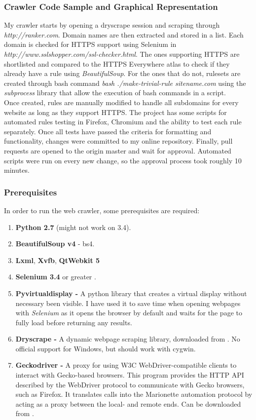 \documentclass[a4paper, 12pt, titlepage]{article}
\begin{document}
\subsubsection{Crawler Code Sample and Graphical Representation}
My crawler starts by opening a dryscrape session and scraping through \textit{http://ranker.com}. Domain names are then extracted and stored in a list. Each domain is checked for HTTPS support using Selenium in \textit{http://www.sslshopper.com/ssl-checker.html}. The ones supporting HTTPS are shortlisted and compared to the HTTPS Everywhere atlas to check if they already have a rule using \textit{BeautifulSoup}. For the ones that do not, rulesets are created through bash command \textit{bash ./make-trivial-rule sitename.com} using the \textit{subprocess} library that allow the execution of bash commands in a script. \\[6pt]
Once created, rules are manually modified to handle all subdomains for every website as long as they support HTTPS. The project has some scripts for automated rules testing in Firefox, Chromium and the ability to test each rule separately. Once all tests have passed the criteria for formatting and functionality, changes were committed to my online repository. Finally, pull requests are opened to the origin master and wait for approval. Automated scripts were run on every new change, so the approval process took roughly 10 minutes.

\subsubsection{Prerequisites}
In order to run the web crawler, some prerequisites are required:

\begin{enumerate}
\item{\textbf{Python 2.7} (might not work on 3.4).}
\item{\textbf{BeautifulSoup v4} - bs4.}
\item{\textbf{Lxml}, \textbf{Xvfb}, \textbf{QtWebkit 5}}
\item{\textbf{Selenium 3.4} or greater \cite{Selenium}.}
\item{\textbf{Pyvirtualdisplay - }A python library that creates a virtual display without necessary been visible. I have used it to save time when opening webpages with \textit{Selenium} as it opens the browser by default and waits for the page to fully load before returning any results.}
\item{\textbf{Dryscrape - }A dynamic webpage scraping library, downloaded from \cite{DryScrape}. No official support for Windows, but should work with cygwin.}
\item{\textbf{Geckodriver - }A proxy for using W3C WebDriver-compatible clients to interact with Gecko-based browsers. This program provides the HTTP API described by the WebDriver protocol to communicate with Gecko browsers, such as Firefox. It translates calls into the Marionette automation protocol by acting as a proxy between the local- and remote ends. Can be downloaded from \cite{Geckodriver}.}
\end{enumerate}
\end{document}
